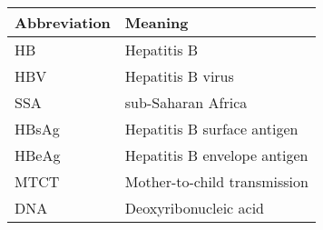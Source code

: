 \begin{table}[h!]
		\begin{tabular}{ |p{2.2cm}|p{10cm}| }
			\hline
			Abbreviation 	& 	Meaning 						\\
			\hline
				HB			&	Hepatitis B						\\
				HBV		 	& 	Hepatitis B virus		   		\\
				SSA			&	sub-Saharan Africa				\\
				HBsAg		& 	Hepatitis B surface antigen		\\
				HBeAg		&	Hepatitis B envelope antigen	\\
				MTCT		&	Mother-to-child transmission	\\
				DNA			&	Deoxyribonucleic acid			\\
			\hline
		\end{tabular}
\end{table}

		